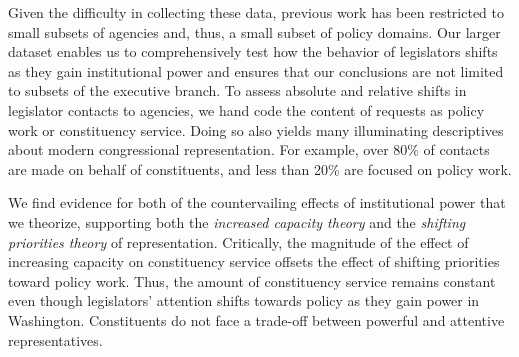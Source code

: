 \documentclass[12pt]{article}
\begin{document}
Given the difficulty in collecting these data, previous work has been restricted to small subsets of agencies and, thus, a small subset of policy domains. Our larger dataset enables us to comprehensively test how the behavior of legislators shifts as they gain institutional power and ensures that our conclusions are not limited to subsets of the executive branch. To assess absolute and relative shifts in legislator contacts to agencies, we hand code the content of  requests as policy work or constituency service. Doing so also yields many illuminating descriptives about modern congressional representation. For example, over 80\% of contacts are made on behalf of constituents, and less than 20\% are focused on policy work. 

We find evidence for both of the countervailing effects of institutional power that we theorize, supporting both the \textit{increased capacity theory} and the \textit{shifting priorities theory} of representation. Critically, the magnitude of the effect of increasing capacity on constituency service offsets the effect of shifting priorities toward policy work. Thus, the amount of constituency service remains constant even though legislators' attention shifts towards policy as they gain power in Washington. Constituents do not face a trade-off between powerful and attentive representatives.



\end{document}
